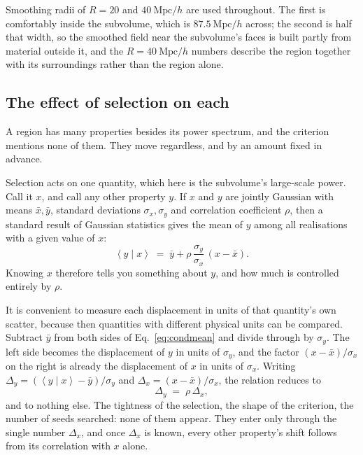 \documentclass[12pt]{article}
\newcommand{\avg}[1]{\left\langle #1 \right\rangle}
\newcommand{\Mpch}{\ \mathrm{Mpc}/h}
\begin{document}
Smoothing radii of $R = 20$ and $40\Mpch$ are used throughout. The first is
comfortably inside the subvolume, which is $87.5\Mpch$ across; the second is
half that width, so the smoothed field near the subvolume's faces is built
partly from material outside it, and the $R = 40\Mpch$ numbers describe the
region together with its surroundings rather than the region alone.

\subsection{The effect of selection on each}
\label{sec:each}

A region has many properties besides its power spectrum, and the criterion
mentions none of them. They move regardless, and by an amount fixed in advance.

Selection acts on one quantity, which here is the subvolume's large-scale power.
Call it $x$, and call any other property $y$. If $x$ and $y$ are jointly
Gaussian with means $\bar x, \bar y$, standard deviations $\sigma_x, \sigma_y$
and correlation coefficient $\rho$, then a standard result of Gaussian
statistics gives the mean of $y$ among all realisations with a given value of
$x$:
\begin{equation}
  \label{eq:condmean}
  \avg{y \mid x} \;=\; \bar y + \rho\,\frac{\sigma_y}{\sigma_x}\,(x - \bar x).
\end{equation}
Knowing $x$ therefore tells you something about $y$, and how much is controlled
entirely by $\rho$.

It is convenient to measure each displacement in units of that quantity's own
scatter, because then quantities with different physical units can be compared.
Subtract $\bar y$ from both sides of Eq.~\eqref{eq:condmean} and divide through
by $\sigma_y$. The left side becomes the displacement of $y$ in units of
$\sigma_y$, and the factor $(x - \bar x)/\sigma_x$ on the right is already the
displacement of $x$ in units of $\sigma_x$. Writing
$\Delta_y = (\avg{y \mid x} - \bar y)/\sigma_y$ and
$\Delta_x = (x - \bar x)/\sigma_x$, the relation reduces to
\begin{equation}
  \label{eq:rho}
  \Delta_y \;=\; \rho\,\Delta_x ,
\end{equation}
and to nothing else. The tightness of the selection, the shape of the criterion,
the number of seeds searched: none of them appear. They enter only through the
single number $\Delta_x$, and once $\Delta_x$ is known, every other property's
shift follows from its correlation with $x$ alone.
\end{document}

